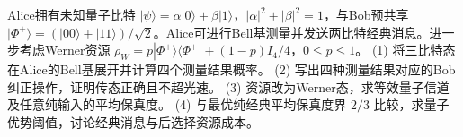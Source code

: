 Alice拥有未知量子比特 \(|\psi\rangle=\alpha|0\rangle+\beta|1\rangle\)，\(|\alpha|^2+|\beta|^2=1\)，与Bob预共享 \(|\Phi^+\rangle=(|00\rangle+|11\rangle)/\sqrt2\)。Alice可进行Bell基测量并发送两比特经典消息。进一步考虑Werner资源 \(\rho_W=p|\Phi^+\rangle\langle\Phi^+|+(1-p)I_4/4\)，\(0\le p\le1\)。
(1) 将三比特态在Alice的Bell基展开并计算四个测量结果概率。
(2) 写出四种测量结果对应的Bob纠正操作，证明传态正确且不超光速。
(3) 资源改为Werner态，求等效量子信道及任意纯输入的平均保真度。
(4) 与最优纯经典平均保真度界 \(2/3\) 比较，求量子优势阈值，讨论经典消息与后选择资源成本。
